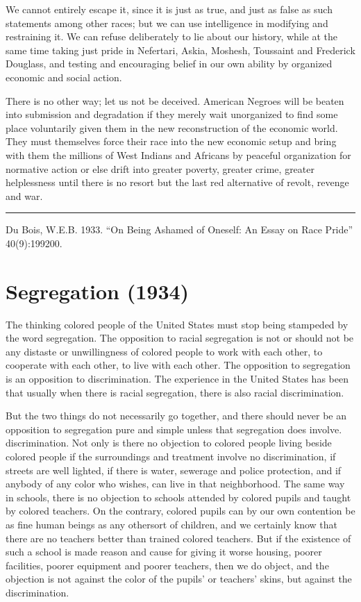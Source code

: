 \documentclass[letterpaper,10pt,english]{jupyterBook}
\begin{document}
\sphinxAtStartPar
We cannot entirely escape it, since it is just as true, and just as false as such statements among other races; but we can use intelligence in modifying and restraining it. We can refuse deliberately to lie about our history, while at the same time taking just pride in Nefertari, Askia, Moshesh, Toussaint and Frederick Douglass, and testing and encouraging belief in our own ability by organized economic and social action.

\sphinxAtStartPar
There is no other way; let us not be deceived. American Negroes will be beaten into submission and degradation if they merely wait unorganized to find some place voluntarily given them in the new reconstruction of the economic world. They must themselves force their race into the new economic set\sphinxhyphen{}up and bring with them the millions of West Indians and Africans by peaceful organization for normative action or else drift into greater poverty, greater crime, greater helplessness until there is no resort but the last red alternative of revolt, revenge and war.


\bigskip\hrule\bigskip


\sphinxAtStartPar
{} Du Bois, W.E.B. 1933. “On Being Ashamed of Oneself: An Essay on Race Pride”  40(9):199\sphinxhyphen{}200.


\section{Segregation (1934)}
\label{\detokenize{Volumes/41/01/segregation:segregation-1934}}\label{\detokenize{Volumes/41/01/segregation::doc}}
\sphinxAtStartPar
The thinking colored people of the United States must stop being stampeded by the word segregation. The opposition to racial segregation is not or should not be any distaste or unwillingness of colored people to work with each other, to cooperate with each other, to live with each other. The opposition to segregation is an opposition to discrimination. The experience in the United States has been that usually when there is racial segregation, there is also racial discrimination.

\sphinxAtStartPar
But the two things do not necessarily go together, and there should never be an opposition to segregation pure and simple unless that segregation does involve. discrimination. Not only is there no objection to colored people living beside colored people if the surroundings and treatment involve no discrimination, if streets are well lighted, if there is water, sewerage and police protection, and if anybody of any color who wishes, can live in that neighborhood. The same way in schools, there is no objection to schools attended by colored pupils and taught by colored teachers. On the contrary, colored pupils can by our own contention be as fine human beings as any other\sphinxhyphen{}sort of children, and we certainly know that there are no teachers better than trained colored teachers. But if the existence of such a school is made reason and cause for giving it worse housing, poorer facilities, poorer equipment and poorer teachers, then we do object, and the objection is not against the color of the pupils’ or teachers’ skins, but against the discrimination.
\end{document}
